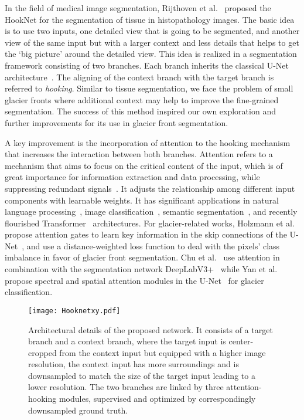 \documentclass[lettersize,journal,siunitx]{IEEEtran}
\begin{document}
In the field of medical image segmentation, Rijthoven et al.~\cite{van2021hooknet} proposed the HookNet for the segmentation of tissue in histopathology images.
The basic idea is to use two inputs, one detailed view that is going to be segmented, and another view of the same input but with a larger context and less details that helps to get the `big picture' around the detailed view. 
This idea is realized in a segmentation framework consisting of two branches. Each branch inherits the classical U-Net architecture~\cite{ronneberger2015u}. The aligning of the context branch with the target branch is referred to \emph{hooking}. Similar to tissue segmentation, we face the problem of small glacier fronts where additional context may help to improve the fine-grained segmentation. The success of this method inspired our own exploration and further improvements for its use in glacier front segmentation.

A key improvement is the incorporation of attention to the hooking mechanism that increases the interaction between both branches. Attention refers to a mechanism that aims to focus on the critical content of the input, which is of great importance for information extraction and data processing, while suppressing redundant signals~\cite{woo2018cbam}. It adjusts the relationship among different input components with learnable weights. It has significant applications in natural language processing~\cite{hu2019introductory,galassi2020attention,liu2021attention,shen2018disan}, image classification~\cite{touvron2021training,liu2021swin,lu2021soft}, semantic segmentation~\cite{wang2021crossformer,lee2022mpvit,ali2021xcit,wang2021pyramid,liu2021swin}, and recently flourished Transformer~\cite{vaswani2017attention,liu2021swin,touvron2021training} architectures. For glacier-related works, Holzmann et al.~\cite{holzmann2021glacier} propose attention gates to learn key information in the skip connections of the U-Net~\cite{ronneberger2015u}, and use a distance-weighted loss function to deal with the pixels' class imbalance in favor of glacier front segmentation. Chu et al.~\cite{chu2022glacier} use attention in combination with the segmentation network DeepLabV3+~\cite{chen2018encoder} while Yan et al.~\cite{yan2021glacier} propose spectral and spatial attention modules in the U-Net~\cite{ronneberger2015u} for glacier classification.

\begin{figure*}[t]
\centering
\texttt{[image: Hooknetxy.pdf]}
\caption{Architectural details of the proposed network. It consists of a target branch and a context branch, where the target input is center-cropped from the context input but equipped with a higher image resolution, the context input has more surroundings and is downsampled to match the size of the target input leading to a lower resolution. The two branches are linked by three attention-hooking modules, supervised and optimized by correspondingly downsampled ground truth.}\label{fig1}
\end{figure*}
\end{document}
